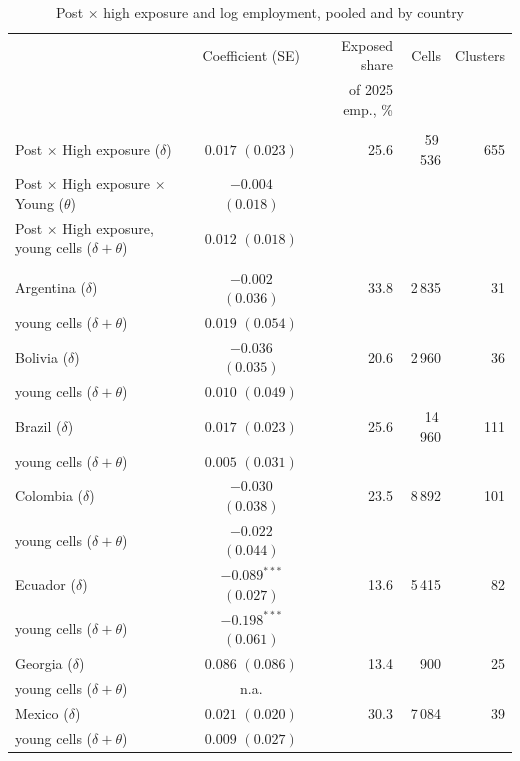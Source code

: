 \begin{table}[htbp]
\centering
\footnotesize
\setlength{\tabcolsep}{5pt}
\begin{threeparttable}
\caption{Post $\times$ high exposure and log employment, pooled and by country}
\label{tab:country}
\begin{tabular}{lcrrr}
\toprule
 & Coefficient (SE) & Exposed share & Cells & Clusters \\
 &  & of 2025 emp., \% &  &  \\
\midrule
\addlinespace
\multicolumn{5}{@{}l}{\textit{Pooled, eleven countries}} \\
Post $\times$ High exposure ($\delta$) & $0.017$ $(0.023)$ & 25.6 & 59\,536 & 655 \\
Post $\times$ High exposure $\times$ Young ($\theta$) & $-0.004$ $(0.018)$ &  &  &  \\
Post $\times$ High exposure, young cells ($\delta + \theta$) & $0.012$ $(0.018)$ &  &  &  \\
\addlinespace
\multicolumn{5}{@{}l}{\textit{By country}} \\
Argentina ($\delta$) & $-0.002$ $(0.036)$ & 33.8 & 2\,835 & 31 \\
\quad young cells ($\delta + \theta$) & $0.019$ $(0.054)$ &  &  &  \\
Bolivia ($\delta$) & $-0.036$ $(0.035)$ & 20.6 & 2\,960 & 36 \\
\quad young cells ($\delta + \theta$) & $0.010$ $(0.049)$ &  &  &  \\
Brazil ($\delta$) & $0.017$ $(0.023)$ & 25.6 & 14\,960 & 111 \\
\quad young cells ($\delta + \theta$) & $0.005$ $(0.031)$ &  &  &  \\
Colombia ($\delta$) & $-0.030$ $(0.038)$ & 23.5 & 8\,892 & 101 \\
\quad young cells ($\delta + \theta$) & $-0.022$ $(0.044)$ &  &  &  \\
Ecuador ($\delta$) & $-0.089^{***}$ $(0.027)$ & 13.6 & 5\,415 & 82 \\
\quad young cells ($\delta + \theta$) & $-0.198^{***}$ $(0.061)$ &  &  &  \\
Georgia ($\delta$) & $0.086$ $(0.086)$ & 13.4 & 900 & 25 \\
\quad young cells ($\delta + \theta$) & n.a. &  &  &  \\
Mexico ($\delta$) & $0.021$ $(0.020)$ & 30.3 & 7\,084 & 39 \\
\quad young cells ($\delta + \theta$) & $0.009$ $(0.027)$ &  &  &  \\

\end{tabular}
\end{threeparttable}
\end{table}

